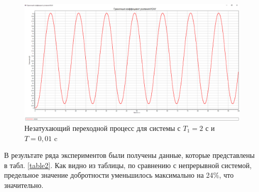 	\begin{figure}[!h]
		\centering\includegraphics[width=.75\textwidth]{png/graph4.png}
		\caption{Незатухающий переходной процесс для системы с $T_1 = 2$ с и $T=0,01$ c}
		\label{graph4}
	\end{figure}
	
	В результате ряда экспериментов были получены данные, которые представлены в табл. \ref{table2}. Как видно из таблицы, по сравнению с непрерывной системой, предельное значение добротности уменьшилось максимально на 24\%, что значительно.
	
	\begin{table}[]
		\caption{Предельные значения добротности для разных параметров ИСАУ}
		\label{table2}
	\end{table}
	
